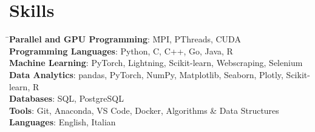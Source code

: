 \vspace*{-15px}
\section{{\normalfont Skills}}

\begin{tabbing}
\qquad
\= \small \textbf{Parallel and GPU Programming}: \qquad \= MPI, PThreads, CUDA \\
\> \small \textbf{Programming Languages}: \> \small Python, C, C++, Go, Java, R \\
\> \small \textbf{Machine Learning}: \> \small PyTorch, Lightning, Scikit-learn, Webscraping, Selenium \\
\> \small \textbf{Data Analytics}: \> \small pandas, PyTorch, NumPy, Matplotlib, Seaborn, Plotly, Scikit-learn, R \\
\> \small \textbf{Databases}: \> \small SQL, PostgreSQL \\
\> \small \textbf{Tools}: \> \small Git, Anaconda, VS Code, Docker, Algorithms \& Data Structures \\
\> \small \textbf{Languages}: \> \small English, Italian \\
\end{tabbing}











